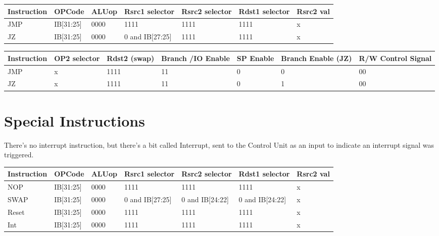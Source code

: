 \begin{center}
\begin{tabular}{||p{20mm}| p{15mm}| p{15mm}| p{15mm}| p{15mm}| p{15mm}| p{15mm}||} 
\hline
Instruction & OPCode & ALUop & Rsrc1 selector & Rsrc2 selector & Rdst1 selector & Rsrc2 val \\ [0.5ex] 
\hline\hline
JMP & IB[31:25] & 0000 & 1111 & 1111 & 1111 & x \\
\hline
JZ & IB[31:25] & 0000 & 0 and IB[27:25] & 1111 & 1111 & x \\
\hline
\end{tabular}
\end{center}

\begin{center}
\begin{tabular}{||p{20mm}| p{15mm}| p{15mm}| p{15mm}| p{15mm}| p{15mm}| p{15mm}||} 
\hline
Instruction & OP2 selector & Rdst2 (swap) & Branch /IO Enable & SP Enable & Branch Enable (JZ) & R/W Control Signal  \\ [0.5ex] 
\hline\hline
JMP & x & 1111 & 11 & 0 & 0 & 00 \\
\hline
JZ & x & 1111 & 11 & 0 & 1 & 00 \\
\hline
\end{tabular}
\end{center}

\section{Special Instructions}
There's no interrupt instruction, but there's a bit called Interrupt, sent to the Control Unit as an input to indicate an interrupt signal was triggered.

\begin{center}
\begin{tabular}{||p{20mm}| p{15mm}| p{15mm}| p{15mm}| p{15mm}| p{15mm}| p{15mm}||} 
\hline
Instruction & OPCode & ALUop & Rsrc1 selector & Rsrc2 selector & Rdst1 selector & Rsrc2 val \\ [0.5ex] 
\hline\hline
NOP & IB[31:25] & 0000 & 1111 & 1111 & 1111 & x \\
\hline
SWAP & IB[31:25] & 0000 & 0 and IB[27:25] & 0 and IB[24:22] & 0 and IB[24:22] & x \\
\hline
Reset & IB[31:25] & 0000 & 1111 & 1111 & 1111 & x\\
\hline
Int & IB[31:25] & 0000 & 1111 & 1111 & 1111 & x \\
\hline
\end{tabular}
\end{center}

